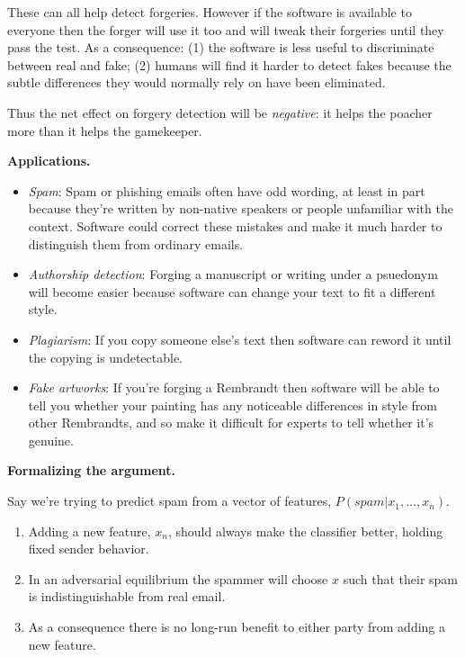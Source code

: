 \documentclass[
  11pt,
  letterpaper,
  DIV=11,
  numbers=noendperiod,
  oneside]{scrartcl}
\providecommand{\tightlist}{%
  \setlength{\itemsep}{0pt}\setlength{\parskip}{0pt}}\usepackage{longtable,booktabs,array}
\begin{document}
These can all help detect forgeries. However if the software is
available to everyone then the forger will use it too and will tweak
their forgeries until they pass the test. As a consequence: (1) the
software is less useful to discriminate between real and fake; (2)
humans will find it harder to detect fakes because the subtle
differences they would normally rely on have been eliminated.

Thus the net effect on forgery detection will be \emph{negative}: it
helps the poacher more than it helps the gamekeeper.

\textbf{Applications.}

\begin{itemize}
\item
  \emph{Spam}: Spam or phishing emails often have odd wording, at least
  in part because they're written by non-native speakers or people
  unfamiliar with the context. Software could correct these mistakes and
  make it much harder to distinguish them from ordinary emails.
\item
  \emph{Authorship detection}: Forging a manuscript or writing under a
  psuedonym will become easier because software can change your text to
  fit a different style.
\item
  \emph{Plagiarism}: If you copy someone else's text then software can
  reword it until the copying is undetectable.
\item
  \emph{Fake artworks}: If you're forging a Rembrandt then software will
  be able to tell you whether your painting has any noticeable
  differences in style from other Rembrandts, and so make it difficult
  for experts to tell whether it's genuine.
\end{itemize}

\textbf{Formalizing the argument.}

Say we're trying to predict spam from a vector of features,
\(P(spam|x_1,\ldots,x_n)\).

\begin{enumerate}
\def\labelenumi{\arabic{enumi}.}
\tightlist
\item
  Adding a new feature, \(x_n\), should always make the classifier
  better, holding fixed sender behavior.
\item
  In an adversarial equilibrium the spammer will choose \(x\) such that
  their spam is indistinguishable from real email.
\item
  As a consequence there is no long-run benefit to either party from
  adding a new feature.
\end{enumerate}
\end{document}

